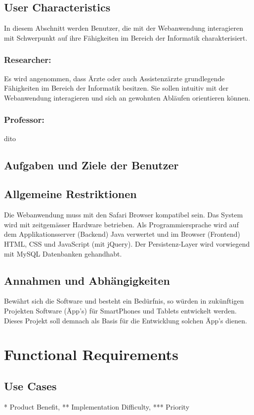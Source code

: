 \documentclass[a4paper,draftmode]{srs}
\begin{document}
\subsection{User Characteristics}
In diesem Abschnitt werden Benutzer, die mit der Webanwendung interagieren mit Schwerpunkt auf ihre Fähigkeiten im Bereich der Informatik charakterisiert.
	\subsubsection{Researcher:}
Es wird angenommen, dass Ärzte oder auch Assistenzärzte grundlegende Fähigkeiten im Bereich der Informatik besitzen. Sie sollen intuitiv mit der Webanwendung interagieren und sich an gewohnten Abläufen orientieren können.
	\subsubsection{Professor:}
dito

\subsection{Aufgaben und Ziele der Benutzer}

\subsection{Allgemeine Restriktionen}
Die Webanwendung muss mit den Safari Browser kompatibel sein.
Das System wird mit zeitgemässer Hardware betrieben.
Als Programmiersprache wird auf dem Applikationsserver (Backend) Java verwertet und im Browser (Frontend) HTML, CSS und JavaScript (mit jQuery). Der Persistenz-Layer wird vorwiegend mit MySQL Datenbanken gehandhabt.

\subsection{Annahmen und Abhängigkeiten}
Bewährt sich die Software und besteht ein Bedürfnis, so würden in zukünftigen Projekten Software (Äpp's) für SmartPhones und Tablets entwickelt werden. Dieses Projekt soll demnach als Basis für die Entwicklung solchen Äpp's dienen.

	\section{Functional Requirements}

\subsection{Use Cases}
* Product Benefit, ** Implementation Difficulty, *** Priority
\end{document}
